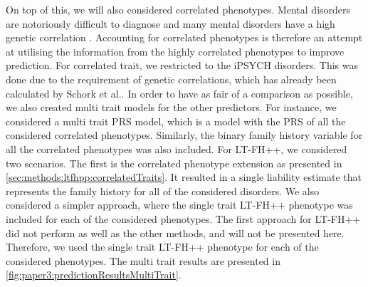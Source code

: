 On top of this, we will also considered correlated phenotypes. Mental disorders are notoriously difficult to diagnose and many mental disorders have a high genetic correlation \cite{schork2019genome,hyman2010diagnosis}. Accounting for correlated phenotypes is therefore an attempt at utilising the information from the highly correlated phenotypes to improve prediction. For correlated trait, we restricted to the iPSYCH disorders. This was done due to the requirement of genetic correlations, which has already been calculated by Schork et al.\cite{schork2019genome}. In order to have as fair of a comparison as possible, we also created multi trait models for the other predictors. For instance, we considered a multi trait PRS model, which is a model with the PRS of all the considered correlated phenotypes. Similarly, the binary family history variable for all the correlated phenotypes was also included. For LT-FH++, we considered two scenarios. The first is the correlated phenotype extension as presented in \cref{sec:methods:ltfhpp:correlatedTraits}. It resulted in a single liability estimate that represents the family history for all of the considered disorders. We also considered a simpler approach, where the single trait LT-FH++ phenotype was included for each of the considered phenotypes. The first approach for LT-FH++ did not perform as well as the other methods, and will not be presented here. Therefore, we used the single trait LT-FH++ phenotype for each of the considered phenotypes. The multi trait results are presented in \cref{fig:paper3:predictionResultsMultiTrait}. 

